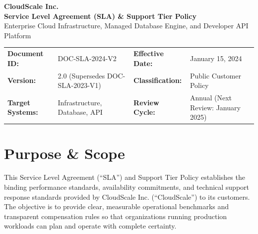 \documentclass[10pt,letterpaper]{article}
\begin{document}
\begin{center}
  {\LARGE\bfseries\color{primary} CloudScale Inc.}\\[1.5pt]
  {\Large\bfseries\color{secondary} Service Level Agreement (SLA) \& Support Tier Policy}\\[1pt]
  {\small\color{darkgray} Enterprise Cloud Infrastructure, Managed Database Engine, and Developer API Platform}
\end{center}

\vspace{-4pt}

\begin{tcolorbox}
\begin{tabularx}{\linewidth}{@{}l X l X@{}}
  \textbf{Document ID:} & DOC-SLA-2024-V2 & \textbf{Effective Date:} & January 15, 2024 \\
  \textbf{Version:} & 2.0 (Supersedes DOC-SLA-2023-V1) & \textbf{Classification:} & Public Customer Policy \\
  \textbf{Target Systems:} & Infrastructure, Database, API & \textbf{Review Cycle:} & Annual (Next Review: January 2025)
\end{tabularx}
\end{tcolorbox}

\vspace{-2pt}

\section{Purpose \& Scope}
This Service Level Agreement (``SLA'') and Support Tier Policy establishes the binding performance standards, availability commitments, and technical support response standards provided by CloudScale Inc. (``CloudScale'') to its customers. The objective is to provide clear, measurable operational benchmarks and transparent compensation rules so that organizations running production workloads can plan and operate with complete certainty.
\end{document}

